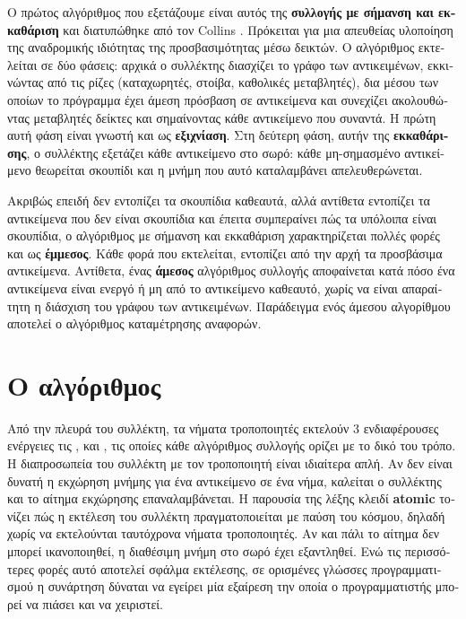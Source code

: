 \begin{greek}
Ο πρώτος αλγόριθμος που εξετάζουμε είναι αυτός της 
\textbf{συλλογής με σήμανση και εκκαθάριση} και διατυπώθηκε από
τον Collins \cite{DBLP:journals/cacm/McCarthy60}. Πρόκειται για
μια απευθείας υλοποίηση της αναδρομικής ιδιότητας της προσβασιμότητας
μέσω δεικτών. Ο αλγόριθμος εκτελείται σε δύο φάσεις: αρχικά ο
συλλέκτης διασχίζει το γράφο των αντικειμένων, εκκινώντας από
τις ρίζες (καταχωρητές, στοίβα, καθολικές μεταβλητές), δια μέσου
των οποίων το πρόγραμμα έχει άμεση πρόσβαση σε αντικείμενα
και συνεχίζει ακολουθώντας μεταβλητές δείκτες και σημαίνοντας
κάθε αντικείμενο που συναντά. Η πρώτη αυτή φάση είναι γνωστή και
ως \textbf{εξιχνίαση}. Στη δεύτερη φάση, αυτήν της \textbf{εκκαθάρισης},
ο συλλέκτης εξετάζει κάθε αντικείμενο στο σωρό: κάθε μη-σημασμένο
αντικείμενο θεωρείται σκουπίδι και η μνήμη που αυτό καταλαμβάνει
απελευθερώνεται.

Ακριβώς επειδή δεν εντοπίζει τα σκουπίδια καθεαυτά, αλλά αντίθετα 
εντοπίζει τα αντικείμενα που δεν είναι σκουπίδια και έπειτα 
συμπεραίνει πώς τα υπόλοιπα είναι σκουπίδια, ο αλγόριθμος με 
σήμανση και εκκαθάριση χαρακτηρίζεται πολλές φορές και ως
\textbf{έμμεσος}. Κάθε φορά που εκτελείται, εντοπίζει 
από την αρχή τα προσβάσιμα αντικείμενα. Αντίθετα, ένας 
\textbf{άμεσος} αλγόριθμος συλλογής αποφαίνεται κατά 
πόσο ένα αντικείμενα είναι ενεργό ή μη από το αντικείμενο καθεαυτό, 
χωρίς να είναι απαραίτητη η διάσχιση του γράφου των αντικειμένων. 
Παράδειγμα ενός άμεσου αλγορίθμου αποτελεί ο αλγόριθμος 
καταμέτρησης αναφορών.

\section{Ο αλγόριθμος}
Από την πλευρά του συλλέκτη, τα νήματα τροποποιητές εκτελούν 3 
ενδιαφέρουσες ενέργειες τις ,  και
, τις οποίες κάθε αλγόριθμος συλλογής ορίζει
με το δικό του τρόπο. Η διαπροσωπεία του συλλέκτη με τον τροποποιητή
είναι ιδιαίτερα απλή. Αν δεν είναι δυνατή η εκχώρηση μνήμης για 
ένα αντικείμενο σε ένα νήμα, καλείται ο συλλέκτης και το αίτημα 
εκχώρησης επαναλαμβάνεται. Η παρουσία της λέξης κλειδί 
\textbf{atomic} τονίζει πώς η εκτέλεση του συλλέκτη πραγματοποιείται
με παύση του κόσμου, δηλαδή χωρίς να εκτελούνται ταυτόχρονα νήματα
τροποποιητές. Αν και πάλι το αίτημα δεν μπορεί ικανοποιηθεί, η
διαθέσιμη μνήμη στο σωρό έχει εξαντληθεί. Ενώ τις περισσότερες 
φορές αυτό αποτελεί σφάλμα εκτέλεσης, σε ορισμένες γλώσσες
προγραμματισμού η συνάρτηση  δύναται να εγείρει
μία εξαίρεση την οποία ο προγραμματιστής μπορεί να πιάσει και
να χειριστεί.


\end{greek}
